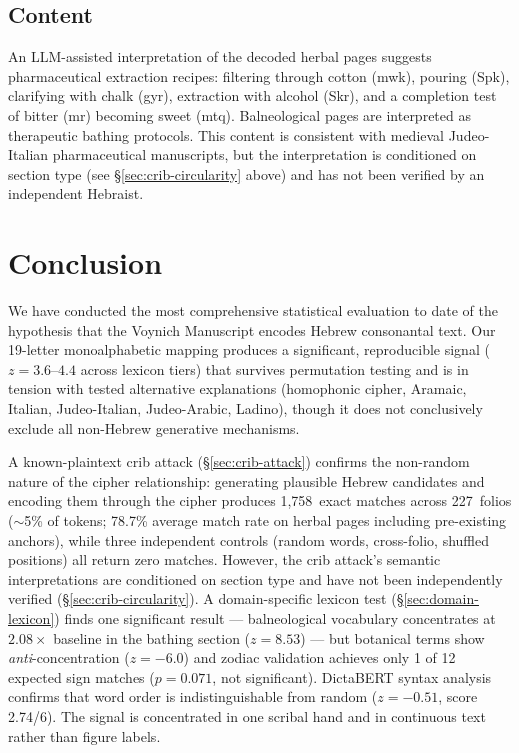 \documentclass[11pt,a4paper]{article}
\newcommand{\heb}[1]{\textsf{#1}}
\begin{document}
\subsection{Content}

An LLM-assisted interpretation of the decoded herbal pages suggests
pharmaceutical extraction recipes: filtering through cotton (\heb{mwk}),
pouring (\heb{Spk}), clarifying with chalk (\heb{gyr}), extraction
with alcohol (\heb{Skr}), and a completion test of bitter (\heb{mr})
becoming sweet (\heb{mtq}). Balneological pages are interpreted as
therapeutic bathing protocols. This content is consistent with medieval
Judeo-Italian pharmaceutical manuscripts, but the interpretation is
conditioned on section type (see \S\ref{sec:crib-circularity} above)
and has not been verified by an independent Hebraist.

\section{Conclusion}
\label{sec:conclusion}

We have conducted the most comprehensive statistical evaluation to date of
the hypothesis that the Voynich Manuscript encodes Hebrew consonantal text.
Our 19-letter monoalphabetic mapping produces a significant, reproducible
signal ($z=3.6$--$4.4$ across lexicon tiers) that survives permutation
testing and is in tension with tested alternative explanations
(homophonic cipher, Aramaic, Italian, Judeo-Italian, Judeo-Arabic, Ladino),
though it does not conclusively exclude all non-Hebrew generative mechanisms.

A known-plaintext crib attack (\S\ref{sec:crib-attack}) confirms the
non-random nature of the cipher relationship: generating plausible Hebrew
candidates and encoding them through the cipher produces 1{,}758~exact
matches across 227~folios ($\sim$5\% of tokens; 78.7\% average match
rate on herbal pages including pre-existing anchors), while three
independent controls (random words, cross-folio, shuffled positions) all
return zero matches. However, the crib attack's semantic interpretations
are conditioned on section type and have not been independently verified
(\S\ref{sec:crib-circularity}). A domain-specific lexicon test
(\S\ref{sec:domain-lexicon}) finds one significant result --- balneological
vocabulary concentrates at $2.08\times$ baseline in the bathing section
($z=8.53$) --- but botanical terms show \emph{anti}-concentration
($z=-6.0$) and zodiac validation achieves only 1 of 12 expected sign
matches ($p=0.071$, not significant). DictaBERT syntax analysis confirms
that word order is indistinguishable from random ($z=-0.51$, score
2.74/6). The signal is concentrated in one scribal hand and in continuous
text rather than figure labels.
\end{document}

